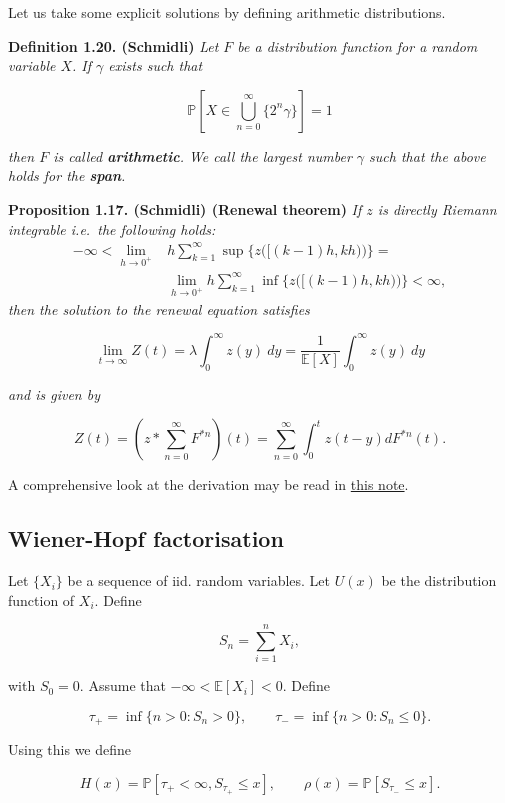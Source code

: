 \documentclass[a4paper,10pt,openany]{book}
\begin{document}
Let us take some explicit solutions by defining arithmetic distributions.

\textbf{Definition 1.20. (Schmidli)} \emph{Let \(F\) be a distribution function for a random variable \(X\). If \(\gamma\) exists such that}

\[
\mathbb P\left[X\in\bigcup_{n=0}^\infty \{2^n\gamma\}\right]=1
\]

\emph{then \(F\) is called \textbf{arithmetic}. We call the largest number \(\gamma\) such that the above holds for the \textbf{span}.}

\textbf{Proposition 1.17. (Schmidli) (Renewal theorem)} \emph{If \(z\) is directly Riemann integrable i.e.~the following holds:}
\begin{align*}
-\infty<\lim_{h\to 0^+}&h\sum_{k=1}^\infty\sup\Big\{z\big([(k-1)h,kh)\big)\Big\}=\\
&\lim_{h\to 0^+}h\sum_{k=1}^\infty\inf\Big\{z\big([(k-1)h,kh)\big)\Big\}<\infty,
\end{align*}
\emph{then the solution to the renewal equation satisfies}

\[
\lim_{t\to\infty}Z(t)=\lambda \int_0^\infty z(y)\ dy=\frac{1}{\mathbb E[X]}\int_0^\infty z(y)\ dy
\]

\emph{and is given by}

\[
Z(t)=\left(z*\sum_{n=0}^\infty F^{*n}\right)(t)=\sum_{n=0}^\infty\int_0^tz(t-y)dF^{*n}(t).
\]

A comprehensive look at the derivation may be read in \href{https://halweb.uc3m.es/esp/personal/personas/bdauria/1112/stoc_proc_phd/Notes/2012-02-28Tu_Notes.pdf}{this note}.

\hypertarget{wiener-hopf-factorisation}{%
\subsection{Wiener-Hopf factorisation}\label{wiener-hopf-factorisation}}

Let \(\{X_i\}\) be a sequence of iid. random variables. Let \(U(x)\) be the distribution function of \(X_i\). Define

\[
S_n=\sum_{i=1}^nX_i,
\]

with \(S_0=0\). Assume that \(-\infty<\mathbb E[X_i]<0\). Define

\[
\tau_+=\inf\{n > 0 : S_n>0\},\qquad \tau_-=\inf\{n>0 : S_n\le 0\}.
\]

Using this we define

\[
H(x)=\mathbb P[\tau_+<\infty, S_{\tau_+}\le x],\qquad \rho(x)=\mathbb P[S_{\tau_-}\le x].
\]
\end{document}
